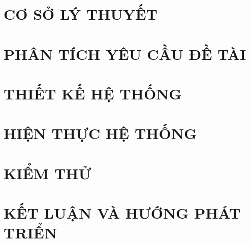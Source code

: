 \documentclass[12pt, a4paper]{report}
\begin{document}
\chapter{\textbf{CƠ SỞ LÝ THUYẾT}}
\newpage

\newpage
\chapter{\textbf{PHÂN TÍCH YÊU CẦU ĐỀ TÀI}}
\newpage

\newpage
\chapter{\textbf{THIẾT KẾ HỆ THỐNG}}
\newpage

\newpage

\chapter{\textbf{HIỆN THỰC HỆ THỐNG}}
\newpage

\newpage

\chapter{\textbf{KIỂM THỬ}}
\newpage

\newpage

\chapter{\textbf{KẾT LUẬN VÀ HƯỚNG PHÁT TRIỂN}}
\newpage


\end{document}
